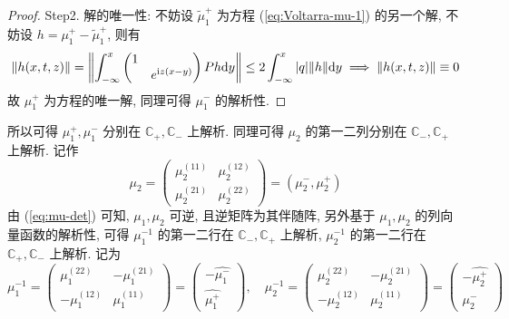 \begin{proof}
  Step2. 解的唯一性: 不妨设 $ \tilde{\mu}_{1}^{+} $ 为方程 (\ref{eq:Voltarra-mu-1}) 的另一个解, 不妨设 $ h = \mu_{1}^{+} - \tilde{\mu}_{1}^{+} $, 则有 
  \begin{equation}
    \| h(x,t,z) \| = \left\| \int_{-\infty}^{x} \begin{pmatrix} 1 &  \\  & e^{ \mathrm{i} z (x - y)} \end{pmatrix} P h \mathrm{d} y \right\| \leq 2 \int_{-\infty}^{x} | q | \|  h \| \mathrm{d} y \implies \| h(x,t,z) \| \equiv  0
  \end{equation}
  故 $ \mu_{1}^{+} $ 为方程的唯一解, 同理可得 $ \mu_{1}^{-} $ 的解析性.
\end{proof}

所以可得 $ \mu_{1}^{+}, \mu_{1}^{-} $ 分别在 $ \mathbb{C}_{+}, \mathbb{C}_{-} $ 上解析. 同理可得 $ \mu_{2} $ 的第一二列分别在 $ \mathbb{C}_{-}, \mathbb{C}_{+} $ 上解析. 记作 
\begin{equation*}
 \mu_{2} = 
 \begin{pmatrix} 
  \mu_{2}^{(11)} & \mu_{2}^{(12)} \\ \mu_{2}^{(21)} & \mu_{2}^{(22)} 
\end{pmatrix} = (\mu_{2}^{-}, \mu_{2}^{+})
\end{equation*}
由 (\ref{eq:mu-det}) 可知, $ \mu_{1}, \mu_{2} $ 可逆, 且逆矩阵为其伴随阵, 另外基于 $ \mu_{1}, \mu_{2} $ 的列向量函数的解析性, 可得 $ \mu_{1}^{-1} $ 的第一二行在 $ \mathbb{C}_{-}, \mathbb{C}_{+} $ 上解析, $ \mu_{2}^{-1} $ 的第一二行在 $ \mathbb{C}_{+}, \mathbb{C}_{-} $ 上解析. 记为
\begin{equation}
  \mu_{1}^{-1} = 
  \begin{pmatrix} 
   \mu_{1}^{(22)} & - \mu_{1}^{(21)} \\ - \mu_{1}^{(12)} & \mu_{1}^{(11)} 
 \end{pmatrix} = \begin{pmatrix}
  - \hat{\mu_{1}^{-}} \\ \hat{\mu_{1}^{+}}
 \end{pmatrix} 
 , \quad 
  \mu_{2}^{-1} = 
  \begin{pmatrix} 
   \mu_{2}^{(22)} & - \mu_{2}^{(21)} \\ - \mu_{2}^{(12)} & \mu_{2}^{(11)} 
 \end{pmatrix} = \begin{pmatrix}
  - \hat{\mu_{2}^{+}} \\ \hat{\mu_{2}^{-}}
 \end{pmatrix} \label{eq:mu-1-2-inverse-matrix}
\end{equation}
